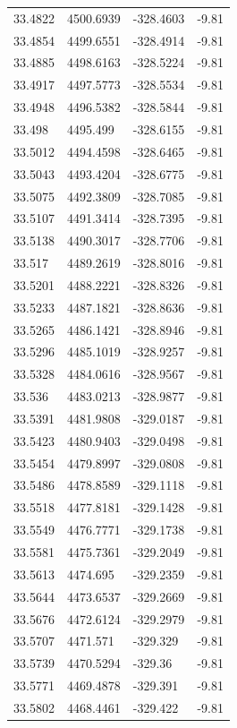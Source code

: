 \begin{table}[H]
\begin{tabular}{llll}
33.4822 & 4500.6939 & -328.4603 & -9.81 \\
33.4854 & 4499.6551 & -328.4914 & -9.81 \\
33.4885 & 4498.6163 & -328.5224 & -9.81 \\
33.4917 & 4497.5773 & -328.5534 & -9.81 \\
33.4948 & 4496.5382 & -328.5844 & -9.81 \\
33.498 & 4495.499 & -328.6155 & -9.81 \\
33.5012 & 4494.4598 & -328.6465 & -9.81 \\
33.5043 & 4493.4204 & -328.6775 & -9.81 \\
33.5075 & 4492.3809 & -328.7085 & -9.81 \\
33.5107 & 4491.3414 & -328.7395 & -9.81 \\
33.5138 & 4490.3017 & -328.7706 & -9.81 \\
33.517 & 4489.2619 & -328.8016 & -9.81 \\
33.5201 & 4488.2221 & -328.8326 & -9.81 \\
33.5233 & 4487.1821 & -328.8636 & -9.81 \\
33.5265 & 4486.1421 & -328.8946 & -9.81 \\
33.5296 & 4485.1019 & -328.9257 & -9.81 \\
33.5328 & 4484.0616 & -328.9567 & -9.81 \\
33.536 & 4483.0213 & -328.9877 & -9.81 \\
33.5391 & 4481.9808 & -329.0187 & -9.81 \\
33.5423 & 4480.9403 & -329.0498 & -9.81 \\
33.5454 & 4479.8997 & -329.0808 & -9.81 \\
33.5486 & 4478.8589 & -329.1118 & -9.81 \\
33.5518 & 4477.8181 & -329.1428 & -9.81 \\
33.5549 & 4476.7771 & -329.1738 & -9.81 \\
33.5581 & 4475.7361 & -329.2049 & -9.81 \\
33.5613 & 4474.695 & -329.2359 & -9.81 \\
33.5644 & 4473.6537 & -329.2669 & -9.81 \\
33.5676 & 4472.6124 & -329.2979 & -9.81 \\
33.5707 & 4471.571 & -329.329 & -9.81 \\
33.5739 & 4470.5294 & -329.36 & -9.81 \\
33.5771 & 4469.4878 & -329.391 & -9.81 \\
33.5802 & 4468.4461 & -329.422 & -9.81 \\

\end{tabular}
\end{table}
